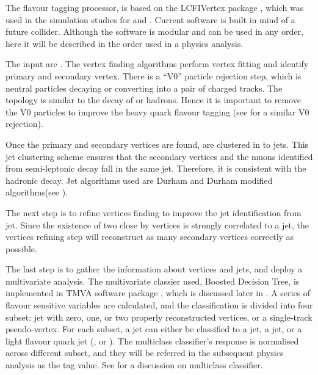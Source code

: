 The flavour tagging processor, \lcfiplus \cite{Suehara:2015ura} is based on the LCFIVertex package \cite{Bailey:2009ui}, which was used in the simulation studies for \ILCloi \cite{Abe:2010aa,Aihara:2009ad} and \CLICcdr \cite{Linssen:2012hp}. Current software is built in mind of a future \ee collider. Although the software is modular and can be used in any order, here it will be described in the order used in a physics analysis.

The input are \PFOs. The vertex finding algorithms perform vertex fitting and identify primary and secondary vertex. There is a ``V0'' particle rejection step, which is neutral particles decaying or converting into a pair of charged tracks. The topology is similar to the decay of \Pbottom or \Pcharm hadrons. Hence it is important to remove the V0 particles to improve the heavy quark flavour tagging (see  for a similar V0 rejection).

Once the primary and secondary vertices are found, \PFOs are clustered in to jets. This jet clustering scheme ensures that the secondary vertices and the muons identified from semi-leptonic decay fall in the same jet. Therefore, it is consistent with the hadronic decay. Jet algorithms used are Durham and Durham modified algorithms(see ).

The next step is to refine vertices finding to improve the \Pbottom jet identification from \Pcharm jet. Since the existence of two close by vertices is strongly correlated to a \Pbottom jet, the vertices refining step will reconstruct as many secondary vertices correctly as possible.

The last step is to gather the information about vertices and jets, and deploy a multivariate analysis. The multivariate classier used, Boosted Decision Tree,  is implemented in TMVA software package \cite{Hocker:2007ht}, which is discussed later in \Section{}. A series of flavour sensitive variables are calculated, and the classification is divided into four subset: jet with zero, one, or two properly reconstructed vertices, or a single-track pseudo-vertex. For each subset, a jet can either be classified to a \Pbottom jet, a \Pcharm jet, or a light flavour quark jet (\Pup, \Pdown or \Pstrange). The multiclass classifier's response is normalised across different subset, and they will be referred in the subsequent physics analysis as the tag value. See \Section{} for a discussion on multiclass classifier.


